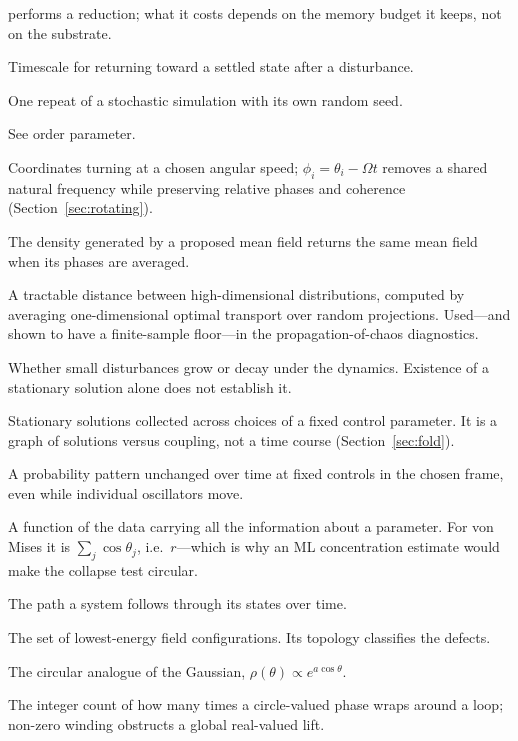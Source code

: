 \documentclass[11pt]{article}
\begin{document}
\begin{description}[leftmargin=1.6cm,style=nextline]
performs a reduction; what it costs depends on the memory budget it keeps, not
on the substrate.
\item[Relaxation time] Timescale for returning toward a settled state after a
disturbance.
\item[Replica] One repeat of a stochastic simulation with its own random seed.
\item[Resultant length] See order parameter.
\item[Rotating frame] Coordinates turning at a chosen angular speed;
$\phi_i=\theta_i-\Omega t$ removes a shared natural frequency while preserving
relative phases and coherence (Section~\ref{sec:rotating}).
\item[Self-consistency] The density generated by a proposed mean field returns
the same mean field when its phases are averaged.
\item[Sliced Wasserstein distance] A tractable distance between
high-dimensional distributions, computed by averaging one-dimensional optimal
transport over random projections. Used---and shown to have a finite-sample
floor---in the propagation-of-chaos diagnostics.
\item[Stability] Whether small disturbances grow or decay under the dynamics.
Existence of a stationary solution alone does not establish it.
\item[Stationary branch] Stationary solutions collected across choices of a
fixed control parameter. It is a graph of solutions versus coupling, not a
time course (Section~\ref{sec:fold}).
\item[Stationary density] A probability pattern unchanged over time at fixed
controls in the chosen frame, even while individual oscillators move.
\item[Sufficient statistic] A function of the data carrying all the
information about a parameter. For von Mises it is $\sum_j\cos\theta_j$, i.e.\
$r$---which is why an ML concentration estimate would make the collapse test
circular.
\item[Trajectory] The path a system follows through its states over time.
\item[Vacuum manifold] The set of lowest-energy field configurations. Its
topology classifies the defects.
\item[von Mises distribution] The circular analogue of the Gaussian,
$\rho(\theta)\propto e^{a\cos\theta}$.
\item[Winding number] The integer count of how many times a circle-valued phase
wraps around a loop; non-zero winding obstructs a global real-valued lift.
\end{description}
\end{document}
